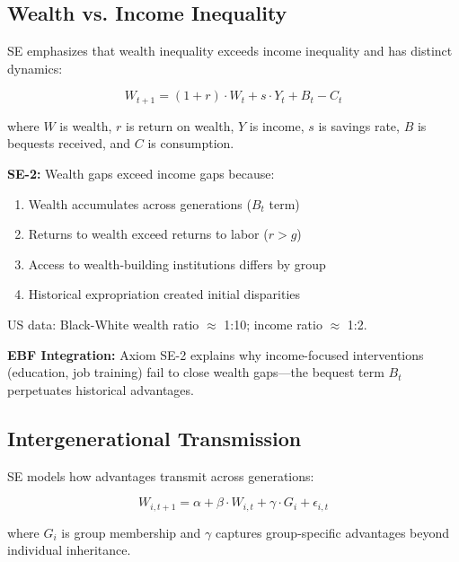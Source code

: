 \subsection{Wealth vs. Income Inequality}
\label{subsec:se-wealth}

SE emphasizes that wealth inequality exceeds income inequality and has distinct dynamics:

\begin{equation}
W_{t+1} = (1 + r) \cdot W_t + s \cdot Y_t + B_t - C_t
\label{eq:se-wealth}
\end{equation}

where $W$ is wealth, $r$ is return on wealth, $Y$ is income, $s$ is savings rate, $B$ is bequests received, and $C$ is consumption.

\begin{axiom}
\label{ax:se-2}
\textbf{SE-2:} Wealth gaps exceed income gaps because:
\begin{enumerate}
    \item Wealth accumulates across generations ($B_t$ term)
    \item Returns to wealth exceed returns to labor ($r > g$)
    \item Access to wealth-building institutions differs by group
    \item Historical expropriation created initial disparities
\end{enumerate}
US data: Black-White wealth ratio $\approx$ 1:10; income ratio $\approx$ 1:2.
\end{axiom}

\textbf{EBF Integration:} Axiom SE-2 explains why income-focused interventions (education, job training) fail to close wealth gaps---the bequest term $B_t$ perpetuates historical advantages.

\subsection{Intergenerational Transmission}
\label{subsec:se-intergenerational}

SE models how advantages transmit across generations:

\begin{equation}
W_{i,t+1} = \alpha + \beta \cdot W_{i,t} + \gamma \cdot G_i + \epsilon_{i,t}
\label{eq:se-transmission}
\end{equation}

where $G_i$ is group membership and $\gamma$ captures group-specific advantages beyond individual inheritance.

